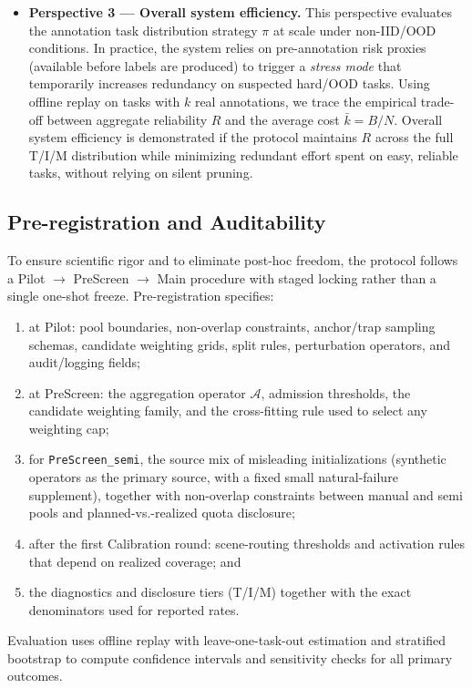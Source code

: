 \begin{itemize}
  \item \textbf{Perspective 3 --- Overall system efficiency.}
  This perspective evaluates the annotation task distribution strategy $\pi$ at scale under non-IID/OOD
  conditions. In practice, the system relies on pre-annotation risk proxies (available before labels are
  produced) to trigger a \emph{stress mode} that temporarily increases redundancy on suspected hard/OOD tasks.
  Using offline replay on tasks with $k$ real annotations, we trace the empirical trade-off between aggregate
  reliability $R$ and the average cost $\bar{k}=B/N$. Overall system efficiency is demonstrated if the protocol
  maintains $R$ across the full T/I/M distribution while minimizing redundant effort spent on easy, reliable
  tasks, without relying on silent pruning.
\end{itemize}

\subsection{Pre-registration and Auditability}

To ensure scientific rigor and to eliminate post-hoc freedom, the protocol follows a Pilot $\rightarrow$
PreScreen $\rightarrow$ Main procedure with staged locking rather than a single one-shot freeze. Pre-registration specifies:
\begin{enumerate}
  \item at Pilot: pool boundaries, non-overlap constraints, anchor/trap sampling schemas, candidate weighting grids, split rules, perturbation operators, and audit/logging fields;
  \item at PreScreen: the aggregation operator $\mathcal{A}$, admission thresholds, the candidate weighting family, and the cross-fitting rule used to select any weighting cap;
  \item for \texttt{PreScreen\_semi}, the source mix of misleading initializations (synthetic operators as the primary source, with a fixed small natural-failure supplement), together with non-overlap constraints between manual and semi pools and planned-vs.-realized quota disclosure;
  \item after the first Calibration round: scene-routing thresholds and activation rules that depend on realized coverage; and
  \item the diagnostics and disclosure tiers (T/I/M) together with the exact denominators used for reported rates.
\end{enumerate}

Evaluation uses offline replay with leave-one-task-out estimation and stratified bootstrap to
compute confidence intervals and sensitivity checks for all primary outcomes.

